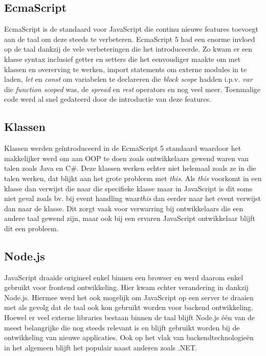 \subsection{EcmaScript}
EcmaScript is de standaard voor JavaScript die continu nieuwe features toevoegt aan de taal om deze steeds te verbeteren. EcmaScript 5 had een enorme invloed op de taal dankzij de vele verbeteringen die het introduceerde. Zo kwam er een klasse syntax inclusief getter en setters die het eenvoudiger maakte om met klassen en overerving te werken, import statements om externe modules in te laden, \textit{let} en \textit{const} om variabelen te declareren die \textit{block scope} hadden i.p.v. \textit{var} die \textit{function scoped} was, de \textit{spread} en \textit{rest} operators en nog veel meer. Toenmalige code werd al snel gedateerd door de introductie van deze features.

\subsection{Klassen}
Klassen werden geïntroduceerd in de EcmaScript 5 standaard waardoor het makkelijker werd om aan OOP te doen zoals ontwikkelaars gewend waren van talen zoals Java en C\#. Deze klassen werken echter niet helemaal zoals ze in die talen werken, dat blijkt aan het grote probleem met \textit{this}. Als \textit{this} voorkomt in een klasse dan verwijst die naar die specifieke klasse maar in JavaScript is dit soms niet geval zoals bv. bij event handling waar\textit{this} dan eerder naar het event verwijst dan naar de klasse. Dit zorgt vaak voor verwarring bij ontwikkelaars die een andere taal gewend zijn, maar ook bij een ervaren JavaScript ontwikkelaar blijft dit een probleem.

\subsection{Node.js}
JavaScript draaide origineel enkel binnen een browser en werd daarom enkel gebruikt voor frontend ontwikkeling. Hier kwam echter verandering in dankzij Node.js. Hiermee werd het ook mogelijk om JavaScript op een server te draaien met als gevolg dat de taal ook kon gebruikt worden voor backend ontwikkeling. Hoewel er veel externe libraries bestaan binnen de taal blijft Node.js één van de meest belangrijke die nog steeds relevant is en blijft gebruikt worden bij de ontwikkeling van nieuwe applicaties. Ook op het vlak van backendtechnologieën in het algemeen blijft het populair naast anderen zoals .NET.

